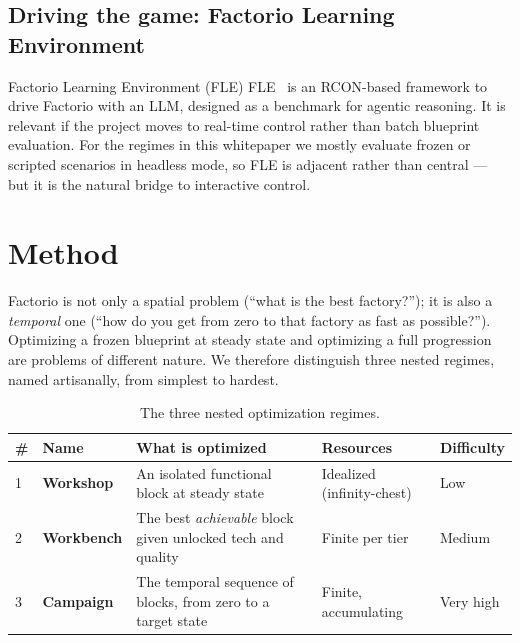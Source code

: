 \documentclass[11pt,a4paper]{article}
\begin{document}
\subsection{Driving the game: Factorio Learning Environment}

\begin{toolbox}{Factorio Learning Environment (FLE)}
FLE~\cite{fle_github,fle_arxiv} is an RCON-based framework to drive Factorio with
an LLM, designed as a benchmark for agentic reasoning. It is relevant if the
project moves to real-time control rather than batch blueprint evaluation. For
the regimes in this whitepaper we mostly evaluate frozen or scripted scenarios in
headless mode, so FLE is adjacent rather than central --- but it is the natural
bridge to interactive control.
\end{toolbox}

\section{Method}
\label{sec:method}

Factorio is not only a spatial problem (``what is the best factory?''); it is
also a \emph{temporal} one (``how do you get from zero to that factory as fast as
possible?''). Optimizing a frozen blueprint at steady state and optimizing a
full progression are problems of different nature. We therefore distinguish three
nested regimes, named artisanally, from simplest to hardest.

\begin{table}[htbp]
\centering
\caption{The three nested optimization regimes.}
\label{tab:regimes}
\small
\begin{tabularx}{\textwidth}{@{}l l X l l@{}}
\toprule
\textbf{\#} & \textbf{Name} & \textbf{What is optimized} & \textbf{Resources} & \textbf{Difficulty}\\
\midrule
1 & \textbf{Workshop} & An isolated functional block at steady state &
  Idealized (infinity-chest) & Low\\[2pt]
2 & \textbf{Workbench} & The best \emph{achievable} block given unlocked tech and quality &
  Finite per tier & Medium\\[2pt]
3 & \textbf{Campaign} & The temporal sequence of blocks, from zero to a target state &
  Finite, accumulating & Very high\\
\bottomrule
\end{tabularx}
\end{table}
\end{document}
